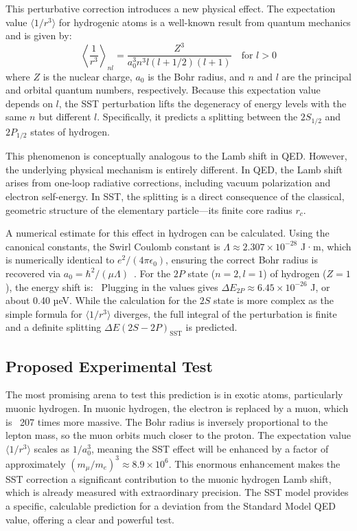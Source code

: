 \documentclass[11pt, a4paper]{article}
\begin{document}
        This perturbative correction introduces a new physical effect. The expectation value $\langle 1/r^3 \rangle$ for hydrogenic atoms is a well-known result from quantum mechanics and is given by:
        \begin{equation}
        \left\langle \frac{1}{r^3} \right\rangle_{nl} = \frac{Z^3}{a_0^3 n^3 l(l+1/2)(l+1)} \quad \text{for } l > 0
        \end{equation}
        where $Z$ is the nuclear charge, $a_0$ is the Bohr radius, and $n$ and $l$ are the principal and orbital quantum numbers, respectively. Because this expectation value depends on $l$, the SST perturbation lifts the degeneracy of energy levels with the same $n$ but different $l$. Specifically, it predicts a splitting between the $2S_{1/2}$ and $2P_{1/2}$ states of hydrogen.

        This phenomenon is conceptually analogous to the Lamb shift in QED. However, the underlying physical mechanism is entirely different. In QED, the Lamb shift arises from one-loop radiative corrections, including vacuum polarization and electron self-energy. In SST, the splitting is a direct consequence of the classical, geometric structure of the elementary particle—its finite core radius $r_c$.

        A numerical estimate for this effect in hydrogen can be calculated. Using the canonical constants, the Swirl Coulomb constant is $\Lambda \approx 2.307 \times 10^{-28}$ J·m, which is numerically identical to $e^2/(4\pi\epsilon_0)$, ensuring the correct Bohr radius is recovered via $a_0 = \hbar^2/(\mu\Lambda)$~\cite{sst_canon}. For the $2P$ state ($n=2, l=1$) of hydrogen ($Z=1$), the energy shift is:
        \
        Plugging in the values gives $\Delta E_{2P} \approx 6.45 \times 10^{-26}$ J, or about 0.40 µeV. While the calculation for the $2S$ state is more complex as the simple formula for $\langle 1/r^3 \rangle$ diverges, the full integral of the perturbation is finite and a definite splitting $\Delta E(2S-2P)_{\text{SST}}$ is predicted.

    \subsection{Proposed Experimental Test}

        The most promising arena to test this prediction is in exotic atoms, particularly muonic hydrogen. In muonic hydrogen, the electron is replaced by a muon, which is ~207 times more massive. The Bohr radius is inversely proportional to the lepton mass, so the muon orbits much closer to the proton. The expectation value $\langle 1/r^3 \rangle$ scales as $1/a_0^3$, meaning the SST effect will be enhanced by a factor of approximately $(m_\mu/m_e)^3 \approx 8.9 \times 10^6$. This enormous enhancement makes the SST correction a significant contribution to the muonic hydrogen Lamb shift, which is already measured with extraordinary precision. The SST model provides a specific, calculable prediction for a deviation from the Standard Model QED value, offering a clear and powerful test.
\end{document}
